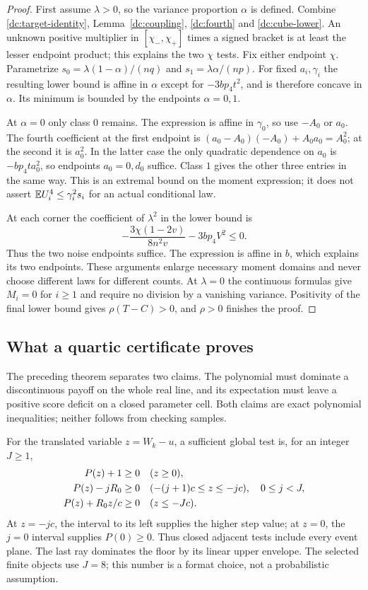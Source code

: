 \begin{proof}
First assume $\lambda>0$, so the variance proportion $\alpha$ is defined.
Combine \eqref{dc:target-identity}, Lemma~\ref{dc:coupling},
\eqref{dc:fourth} and \eqref{dc:cube-lower}.
An unknown positive multiplier in $[\chi_-,\chi_+]$ times a signed bracket is
at least the lesser endpoint product; this explains the two $\chi$ tests.
Fix either endpoint $\chi$. Parametrize
$s_0=\lambda(1-\alpha)/(nq)$ and $s_1=\lambda\alpha/(np)$.
For fixed $a_i,\gamma_i$ the resulting lower bound is affine in
$\alpha$ except for $-3bp_4t^2$, and is therefore concave in $\alpha$.
Its minimum is bounded by the endpoints $\alpha=0,1$.

At $\alpha=0$ only class $0$ remains. The expression is affine in
$\gamma_0$, so use $-A_0$ or $a_0$. The fourth coefficient at the first
endpoint is $(a_0-A_0)(-A_0)+A_0a_0=A_0^2$; at the second it is $a_0^2$.
In the latter case the only quadratic dependence on $a_0$ is
$-bp_4t a_0^2$, so endpoints $a_0=0,d_0$ suffice. Class $1$ gives the
other three entries in the same way. This is an extremal bound on the
moment expression; it does not assert $\mathbb E U_i^4\le\gamma_i^2s_i$ for an
actual conditional law.

At each corner the coefficient of $\lambda^2$ in the lower bound is
\[
 -\frac{3\chi(1-2v)}{8n^2v}-3bp_4V^2\le0.
\]
Thus the two noise endpoints suffice. The expression is affine in $b$,
which explains its two endpoints. These arguments enlarge necessary
moment domains and never choose different laws for different counts.
At $\lambda=0$ the continuous formulas give $M_i=0$ for $i\ge1$ and
require no division by a vanishing variance. Positivity of the final
lower bound gives $\rho(T-C)>0$, and $\rho>0$ finishes the proof.
\end{proof}

\subsection{What a quartic certificate proves}
\label{dc:checking}
The preceding theorem separates two claims. The polynomial must dominate
a discontinuous payoff on the whole real line, and its expectation must
leave a positive score deficit on a closed parameter cell. Both claims
are exact polynomial inequalities; neither follows from checking samples.

For the translated variable $z=W_k-u$, a sufficient global test is, for
an integer $J\ge1$,
\begin{align}\label{dc:global-tests}
 P(z)+1&\ge0&& (z\ge0),\\
 P(z)-jR_0&\ge0&& (-(j+1)c\le z\le-jc),\quad 0\le j<J,\notag\\
 P(z)+R_0z/c&\ge0&& (z\le-Jc).\notag
\end{align}
At $z=-jc$, the interval to its left supplies the higher step value;
at $z=0$, the $j=0$ interval supplies $P(0)\ge0$.
Thus closed adjacent tests include every event plane. The last ray
dominates the floor by its linear upper envelope. The selected finite
objects use $J=8$; this number is a format choice, not a probabilistic
assumption.


